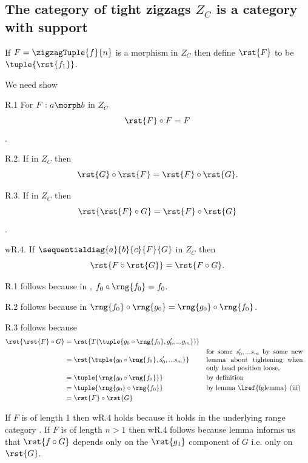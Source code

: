 \subsection{The category of tight zigzags $Z_C$ is a category with support}

If $F=\zigzagTuple{f}{n}$ is a morphism in $Z_C$ then define $\rst{F}$ to be $\tuple{\rst{f_1}}$.

We need show

R.1 For $F:a \morph b$ in $Z_C$ $$\rst{F} \circ F =F$$.

R.2. If \FGsourcediag in $Z_C$ then
$$\rst{G} \circ \rst{F}=\rst{F} \circ \rst{G}.$$

R.3. If \FGsourcediag in $Z_C$ then
$$\rst{\rst{F} \circ G} = \rst{F} \circ \rst{G}$$.

wR.4. If $\sequentialdiag{a}{b}{c}{F}{G}$ in $Z_C$ then
\[
\rst{F \circ \rst{G}} = \rst{F \circ G}.
\]

R.1 follows because in \catcw, $f_0 \circ \rng{f_0} = f_0$. 

R.2 follows because in \catcw $\rng{f_0} \circ \rng{g_0} = \rng{g_0} \circ \rng{f_0}$.

R.3 follows because
\begin{align*}
\rst{\rst{F} \circ G} 
                   &= \rst{T(\tuple{g_0 \circ \rng{f_0},g'_0,...g_m})}\\
                   &= \rst{\tuple{g_0 \circ \rng{f_0},s'_0,...s_m}}
                                             &&\mbox{\parbox{5cm}{for some $s'_0,...s_m$
                                                       by some new lemma about tightening when only head position loose,}}\\
                   &=\tuple{\rng{g_0 \circ \rng{f_0}}} 
                                            && \mbox{by definition}\\
                   &=\tuple{\rng{g_0} \circ \rng{f_0}}  
                                            && \mbox{by lemma \lref{fglemma} (iii)}\\
                   &=\rst{F} \circ \rst{G}      
\end{align*}

If $F$ is of length 1 then wR.4 holds because
it holds in the underlying range category \catcw. 
If $F$ is of length $n > 1$ then wR.4 follows because lemma
 informs us that $\rst{f \circ G}$ depends only on the $\rst{g_1}$ component of $G$ i.e. only on $\rst{G}$.


